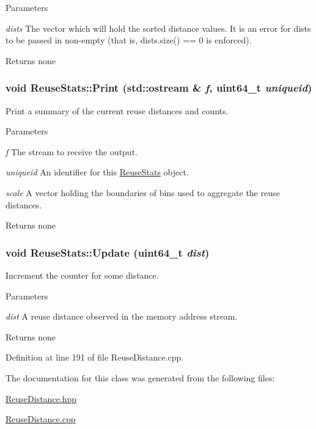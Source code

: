 \begin{DoxyParams}{Parameters}
\item[{\em dists}]The vector which will hold the sorted distance values. It is an error for dists to be passed in non-\/empty (that is, dists.size() == 0 is enforced).\end{DoxyParams}
\begin{DoxyReturn}{Returns}
none 
\end{DoxyReturn}
\hypertarget{class_reuse_stats_a9edd9703b7de1998042cd5f72056d68a}{
\subsubsection[{Print}]{\setlength{\rightskip}{0pt plus 5cm}void ReuseStats::Print (std::ostream \& {\em f}, \/  uint64\_\-t {\em uniqueid})}}
\label{class_reuse_stats_a9edd9703b7de1998042cd5f72056d68a}
Print a summary of the current reuse distances and counts.


\begin{DoxyParams}{Parameters}
\item[{\em f}]The stream to receive the output. \item[{\em uniqueid}]An identifier for this \hyperlink{class_reuse_stats}{ReuseStats} object. \item[{\em scale}]A vector holding the boundaries of bins used to aggregate the reuse distances.\end{DoxyParams}
\begin{DoxyReturn}{Returns}
none 
\end{DoxyReturn}
\hypertarget{class_reuse_stats_a5383136c63ed260d9aad44a8d048a2ed}{
\subsubsection[{Update}]{\setlength{\rightskip}{0pt plus 5cm}void ReuseStats::Update (uint64\_\-t {\em dist})}}
\label{class_reuse_stats_a5383136c63ed260d9aad44a8d048a2ed}
Increment the counter for some distance.


\begin{DoxyParams}{Parameters}
\item[{\em dist}]A reuse distance observed in the memory address stream.\end{DoxyParams}
\begin{DoxyReturn}{Returns}
none 
\end{DoxyReturn}


Definition at line 191 of file ReuseDistance.cpp.



The documentation for this class was generated from the following files:\begin{DoxyCompactItemize}
\item 
\hyperlink{_reuse_distance_8hpp}{ReuseDistance.hpp}\item 
\hyperlink{_reuse_distance_8cpp}{ReuseDistance.cpp}\end{DoxyCompactItemize}
